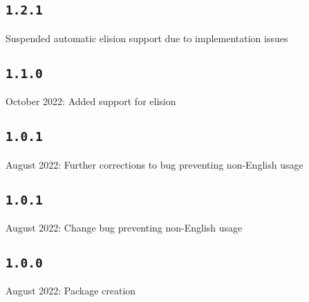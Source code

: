 \documentclass{article}
\begin{document}
\subsection{\normalfont\texttt{1.2.1}}
\ttfamily Suspended automatic elision support due to implementation issues

\subsection{\normalfont\texttt{1.1.0}}
 October 2022: Added support for elision


\subsection{\normalfont\texttt{1.0.1}}



 August 2022: Further corrections to bug preventing non-English usage

\subsection{\normalfont\texttt{1.0.1}}

 August 2022: Change bug preventing non-English usage


\subsection{\normalfont\texttt{1.0.0}}

 August 2022: Package creation

	
\end{document}
